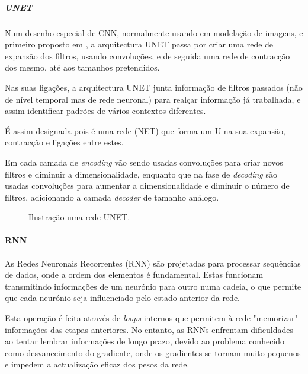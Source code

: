 \subparagraph{UNET\label{se:unet_sec}}
\text{ }  \par
Num desenho especial de \gls{CNN}, normalmente usando em modelação de imagens, e primeiro proposto em \cite{Shelhamer2014}, a arquitectura UNET passa por criar uma rede de expansão dos filtros, usando convoluções, e de seguida uma rede de contracção dos mesmo, até aos tamanhos pretendidos.\par
Nas suas ligações, a arquitectura UNET junta informação de filtros passados (não de nível temporal mas de rede neuronal) para realçar informação já trabalhada, e assim identificar padrões de vários contextos diferentes.\par
É assim designada pois é uma rede (NET) que forma um U na sua expansão, contracção e ligações entre estes.\par
Em cada camada de \textit{encoding} vão sendo usadas convoluções para criar novos filtros e diminuir a dimensionalidade, enquanto que na fase de \textit{decoding} são usadas convoluções para aumentar a dimensionalidade e diminuir o número de filtros, adicionando a camada \textit{decoder} de tamanho análogo.\par

\begin{figure}[H]
	\centering
	\resizebox{\linewidth}{!}{}
	\caption{Ilustração uma rede UNET.}
	\label{fig:unet_graph}
\end{figure}


\paragraph{RNN\label{se:rnn_sec}}
\text{ }  \par

As Redes Neuronais Recorrentes (RNN) são projetadas para processar sequências de dados, onde a ordem dos elementos é fundamental. Estas funcionam transmitindo informações de um neurónio para outro numa cadeia, o que permite que cada neurónio seja influenciado pelo estado anterior da rede.\par
Esta operação é feita através de \textit{loops} internos que permitem à rede "memorizar" informações das etapas anteriores. No entanto, as RNNs enfrentam dificuldades ao tentar lembrar informações de longo prazo, devido ao problema conhecido como desvanecimento do gradiente, onde os gradientes se tornam muito pequenos e impedem a actualização eficaz dos pesos da rede.\par

